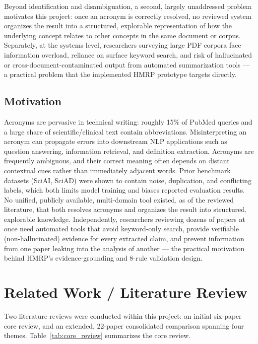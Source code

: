 \documentclass[10pt,conference]{IEEEtran}
\begin{document}
Beyond identification and disambiguation, a second, largely unaddressed problem motivates this project: once an acronym is correctly resolved, no reviewed system organizes the result into a structured, explorable representation of how the underlying concept relates to other concepts in the same document or corpus. Separately, at the systems level, researchers surveying large PDF corpora face information overload, reliance on surface keyword search, and risk of hallucinated or cross-document-contaminated output from automated summarization tools --- a practical problem that the implemented HMRP prototype targets directly.

\subsection{Motivation}
Acronyms are pervasive in technical writing: roughly 15\% of PubMed queries and a large share of scientific/clinical text contain abbreviations. Misinterpreting an acronym can propagate errors into downstream NLP applications such as question answering, information retrieval, and definition extraction. Acronyms are frequently ambiguous, and their correct meaning often depends on distant contextual cues rather than immediately adjacent words. Prior benchmark datasets (SciAI, SciAD) were shown to contain noise, duplication, and conflicting labels, which both limits model training and biases reported evaluation results. No unified, publicly available, multi-domain tool existed, as of the reviewed literature, that both resolves acronyms and organizes the result into structured, explorable knowledge. Independently, researchers reviewing dozens of papers at once need automated tools that avoid keyword-only search, provide verifiable (non-hallucinated) evidence for every extracted claim, and prevent information from one paper leaking into the analysis of another --- the practical motivation behind HMRP's evidence-grounding and 8-rule validation design.

\section{Related Work / Literature Review}
Two literature reviews were conducted within this project: an initial six-paper core review, and an extended, 22-paper consolidated comparison spanning four themes. Table~\ref{tab:core_review} summarizes the core review.
\end{document}
